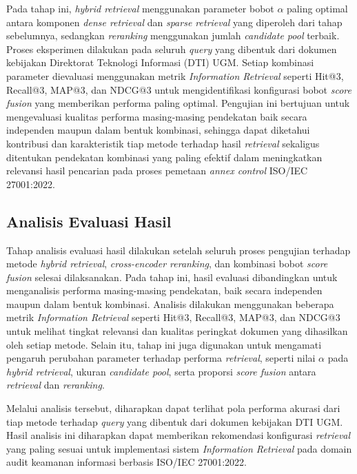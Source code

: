 Pada tahap ini, \textit{hybrid retrieval} menggunakan parameter bobot $\alpha$ paling optimal antara komponen \textit{dense retrieval} dan \textit{sparse retrieval} yang diperoleh dari tahap sebelumnya, sedangkan \textit{reranking} menggunakan jumlah \textit{candidate pool} terbaik. Proses eksperimen dilakukan pada seluruh \textit{query} yang dibentuk dari dokumen kebijakan Direktorat Teknologi Informasi (DTI) UGM. Setiap kombinasi parameter dievaluasi menggunakan metrik \textit{Information Retrieval} seperti Hit@3, Recall@3, MAP@3, dan NDCG@3 untuk mengidentifikasi konfigurasi bobot \textit{score fusion} yang memberikan performa paling optimal. Pengujian ini bertujuan untuk mengevaluasi kualitas performa masing-masing pendekatan baik secara independen maupun dalam bentuk kombinasi, sehingga dapat diketahui kontribusi dan karakteristik tiap metode terhadap hasil \textit{retrieval} sekaligus ditentukan pendekatan kombinasi yang paling efektif dalam meningkatkan relevansi hasil pencarian pada proses pemetaan \textit{annex control} ISO/IEC 27001:2022.

\subsection{Analisis Evaluasi Hasil}

Tahap analisis evaluasi hasil dilakukan setelah seluruh proses pengujian terhadap metode \textit{hybrid retrieval}, \textit{cross-encoder reranking}, dan kombinasi bobot \textit{score fusion} selesai dilaksanakan. Pada tahap ini, hasil evaluasi dibandingkan untuk menganalisis performa masing-masing pendekatan, baik secara independen maupun dalam bentuk kombinasi. Analisis dilakukan menggunakan beberapa metrik \textit{Information Retrieval} seperti Hit@3, Recall@3, MAP@3, dan NDCG@3 untuk melihat tingkat relevansi dan kualitas peringkat dokumen yang dihasilkan oleh setiap metode. Selain itu, tahap ini juga digunakan untuk mengamati pengaruh perubahan parameter terhadap performa \textit{retrieval}, seperti nilai $\alpha$ pada \textit{hybrid retrieval}, ukuran \textit{candidate pool}, serta proporsi \textit{score fusion} antara \textit{retrieval} dan \textit{reranking}.

Melalui analisis tersebut, diharapkan dapat terlihat pola performa akurasi dari tiap metode terhadap \textit{query} yang dibentuk dari dokumen kebijakan DTI UGM. Hasil analisis ini diharapkan dapat memberikan rekomendasi konfigurasi \textit{retrieval} yang paling sesuai untuk implementasi sistem \textit{Information Retrieval} pada domain audit keamanan informasi berbasis ISO/IEC 27001:2022.

